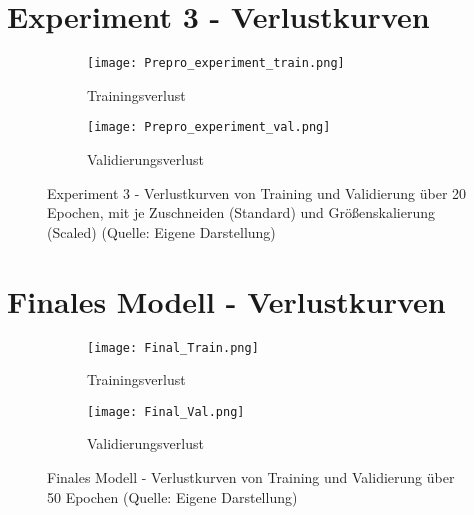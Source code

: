 \chapter{Experiment 3 - Verlustkurven}
\label{appendix:Experiment3Verlustkurven}
\begin{figure}[!ht]
	\centering
	\begin{subfigure}[b]{0.9\textwidth}
		\centering
		\texttt{[image: Prepro\_experiment\_train.png]}
		\caption{Trainingsverlust}
		\label{fig:ex3_prepro_train}
	\end{subfigure}
	\vfil
	\begin{subfigure}[b]{0.9\linewidth}
		\centering
		\texttt{[image: Prepro\_experiment\_val.png]}
		\caption{Validierungsverlust}
		\label{fig:ex3_prepro_val}
	\end{subfigure}
	\caption{Experiment 3 - Verlustkurven von Training und Validierung über 20 Epochen, mit je Zuschneiden (Standard) und Größenskalierung (Scaled) (Quelle: Eigene Darstellung)}
\end{figure} 

\chapter{Finales Modell - Verlustkurven}
\label{appendix:FinalVerlustkurven}
\begin{figure}[!ht]
	\centering
	\begin{subfigure}[b]{0.9\textwidth}
		\centering
		\texttt{[image: Final\_Train.png]}
		\caption{Trainingsverlust}
		\label{fig:final_train}
	\end{subfigure}
	\vfil
	\begin{subfigure}[b]{0.9\linewidth}
		\centering
		\texttt{[image: Final\_Val.png]}
		\caption{Validierungsverlust}
		\label{fig:final_val}
	\end{subfigure}
	\caption{Finales Modell - Verlustkurven von Training und Validierung über 50 Epochen (Quelle: Eigene Darstellung)}
\end{figure} 